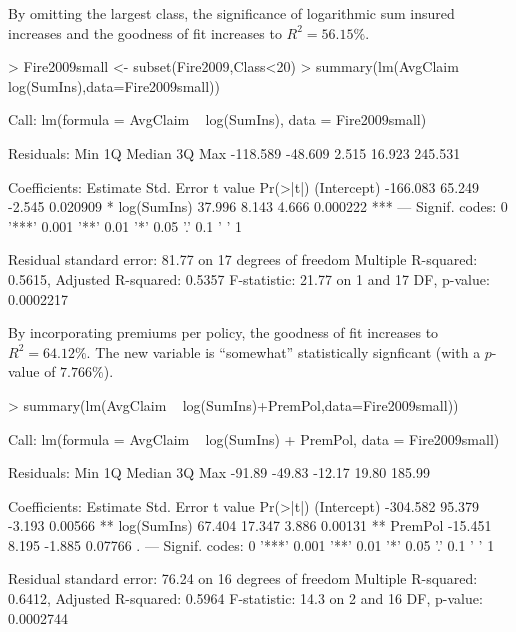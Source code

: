 \documentclass[12pt,letterpaper]{article}
\begin{document}
By omitting the largest class, the significance of logarithmic sum insured increases
and the goodness of fit increases to $R^2 = 56.15\%.$ 
\begin{Schunk}
\begin{Sinput}
> Fire2009small <- subset(Fire2009,Class<20)     
> summary(lm(AvgClaim ~ log(SumIns),data=Fire2009small))
\end{Sinput}
\begin{Soutput}
Call:
lm(formula = AvgClaim ~ log(SumIns), data = Fire2009small)

Residuals:
     Min       1Q   Median       3Q      Max 
-118.589  -48.609    2.515   16.923  245.531 

Coefficients:
            Estimate Std. Error t value Pr(>|t|)    
(Intercept) -166.083     65.249  -2.545 0.020909 *  
log(SumIns)   37.996      8.143   4.666 0.000222 ***
---
Signif. codes:  0 '***' 0.001 '**' 0.01 '*' 0.05 '.' 0.1 ' ' 1

Residual standard error: 81.77 on 17 degrees of freedom
Multiple R-squared:  0.5615,	Adjusted R-squared:  0.5357 
F-statistic: 21.77 on 1 and 17 DF,  p-value: 0.0002217
\end{Soutput}
\end{Schunk}

By incorporating premiums per policy, the goodness of fit increases to $R^2 = 64.12\%.$ 
The new variable is ``somewhat'' statistically signficant (with a $p$-value of $7.766\%$).

\begin{Schunk}
\begin{Sinput}
> summary(lm(AvgClaim ~ log(SumIns)+PremPol,data=Fire2009small))
\end{Sinput}
\begin{Soutput}
Call:
lm(formula = AvgClaim ~ log(SumIns) + PremPol, data = Fire2009small)

Residuals:
   Min     1Q Median     3Q    Max 
-91.89 -49.83 -12.17  19.80 185.99 

Coefficients:
            Estimate Std. Error t value Pr(>|t|)   
(Intercept) -304.582     95.379  -3.193  0.00566 **
log(SumIns)   67.404     17.347   3.886  0.00131 **
PremPol      -15.451      8.195  -1.885  0.07766 . 
---
Signif. codes:  0 '***' 0.001 '**' 0.01 '*' 0.05 '.' 0.1 ' ' 1

Residual standard error: 76.24 on 16 degrees of freedom
Multiple R-squared:  0.6412,	Adjusted R-squared:  0.5964 
F-statistic:  14.3 on 2 and 16 DF,  p-value: 0.0002744
\end{Soutput}
\end{Schunk}
\end{document}
